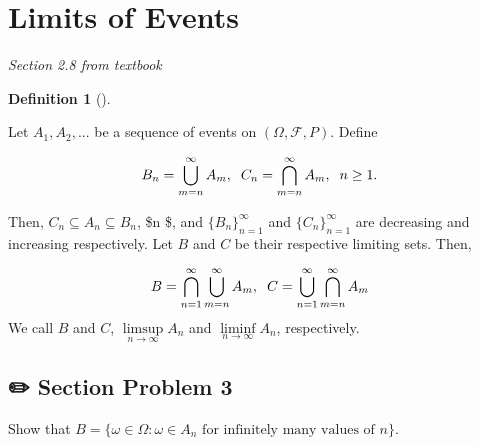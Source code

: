 \documentclass[
  letterpaper,
  DIV=11,
  numbers=noendperiod]{scrreprt}
\theoremstyle{plain}
\theoremstyle{definition}
\newtheorem{definition}{Definition}[chapter]
\theoremstyle{remark}
\begin{document}
\hypertarget{limits-of-events}{%
\section*{Limits of Events}\label{limits-of-events}}


\emph{Section 2.8 from textbook}

\leavevmode{}%
\begin{definition}[]\label{def-lim}

Let \(A_1, A_2,...\) be a sequence of events on
\((\Omega, \mathcal{F}, P)\). Define

\[B_n = \bigcup_{m=n}^{\infty} A_m ,\hspace{0.2cm} C_n = \bigcap_{m=n}^{\infty} A_m, \hspace{0.2cm} n\geq 1 .\]

Then, \(C_n \subseteq A_n \subseteq B_n\), \$\forall n \$, and
\(\{B_n\}^{\infty}_{n=1}\) and \(\{C_n\}^{\infty}_{n=1}\) are decreasing
and increasing respectively. Let \(B\) and \(C\) be their respective
limiting sets. Then,

\[B = \bigcap_{n=1}^{\infty}\bigcup_{m=n}^{\infty} A_m ,\hspace{0.2cm} C = \bigcup_{n=1}^{\infty} \bigcap_{m=n}^{\infty} A_m  \]
We call \(B\) and \(C\), \(\limsup\limits_{n \to \infty}A_n\) and
\(\liminf \limits_{n \to \infty}A_n\), respectively.

\end{definition}

\hypertarget{section-problem-3}{%
\subsection*{✏️ Section Problem 3}\label{section-problem-3}}

Show that
\(B = \{\omega \in \Omega : \omega \in A_n \text{ for infinitely many values of } n\}\).
\end{document}
